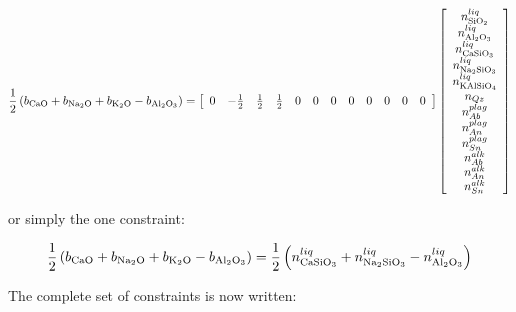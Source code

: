 \documentclass[11pt, titlepage, twoside]{article}
\begin{document}
\begin{MPEquation}[!ht]
\begin{equation}
\frac{1}{2}\left( {{b_{{\rm{CaO}}}} + {b_{{\rm{N}}{{\rm{a}}_2}{\rm{O}}}} + {b_{{{\rm{K}}_2}{\rm{O}}}} - {b_{{\rm{A}}{{\rm{l}}_2}{{\rm{O}}_3}}}} \right) = \left[ {\begin{array}{*{20}{c}}
0&{ - \frac{1}{2}}&{\frac{1}{2}}&{\frac{1}{2}}&0&0&0&0&0&0&0&0
\end{array}} \right]\left[ {\begin{array}{*{20}{c}}
{n_{{\rm{Si}}{{\rm{O}}_2}}^{liq}}\\
{n_{{\rm{A}}{{\rm{l}}_2}{{\rm{O}}_3}}^{liq}}\\
{n_{{\rm{CaSi}}{{\rm{O}}_3}}^{liq}}\\
{n_{{\rm{N}}{{\rm{a}}_2}{\rm{Si}}{{\rm{O}}_3}}^{liq}}\\
{n_{{\rm{KAlSi}}{{\rm{O}}_4}}^{liq}}\\
{{n_{Qz}}}\\
{n_{Ab}^{plag}}\\
{n_{An}^{plag}}\\
{n_{Sn}^{plag}}\\
{n_{Ab}^{alk}}\\
{n_{An}^{alk}}\\
{n_{Sn}^{alk}}
\end{array}} \right]
\end{equation}
\label{MPEquationElement:98CC42D5-E1CD-485B-C7BE-92EE0E219AF5}
\end{MPEquation}
or simply the one constraint:


\begin{MPEquation}[!ht]
\begin{equation}
\frac{1}{2}\left( {{b_{{\rm{CaO}}}} + {b_{{\rm{N}}{{\rm{a}}_2}{\rm{O}}}} + {b_{{{\rm{K}}_2}{\rm{O}}}} - {b_{{\rm{A}}{{\rm{l}}_2}{{\rm{O}}_3}}}} \right) = \frac{1}{2}\left( {n_{{\rm{CaSi}}{{\rm{O}}_3}}^{liq} + n_{{\rm{N}}{{\rm{a}}_2}{\rm{Si}}{{\rm{O}}_3}}^{liq} - n_{{\rm{A}}{{\rm{l}}_2}{{\rm{O}}_3}}^{liq}} \right)
\end{equation}
\label{MPEquationElement:019566F8-F9DA-41B0-9BE2-07AD25AA1972}
\end{MPEquation}
The complete set of constraints is now written:
\end{document}
